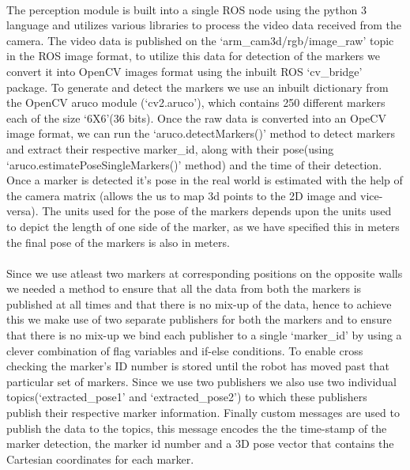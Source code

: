 \paragraph{} The perception module is built into a single ROS node using the python 3 language and utilizes various libraries to process the video data received from the camera. The video data is published on the `arm\_cam3d/rgb/image\_raw' topic in the ROS image format, to utilize this data for detection of the markers we convert it into OpenCV images format using the inbuilt ROS `cv\_bridge' package. To generate and detect the markers we use an inbuilt dictionary from the OpenCV aruco module (`cv2.aruco'), which contains 250 different markers each of the size `6X6'(36 bits). Once the raw data is converted into an OpeCV image format, we can run the `aruco.detectMarkers()' method to detect markers and extract their respective marker\_id, along with their pose(using `aruco.estimatePoseSingleMarkers()' method) and the time of their detection. Once a marker is detected it's pose in the real world is estimated with the help of the camera matrix (allows the us to map 3d points to the 2D image and vice-versa). The units used for the pose of the markers depends upon the units used to depict the length of one side of the marker, as we have specified this in meters the final pose of the markers is also in meters.

\paragraph{} Since we use atleast two markers at corresponding positions on the opposite walls we needed a method to ensure that all the data from both the markers is published at all times and that there is no mix-up of the data, hence to achieve this we make use of two separate publishers for both the markers and to ensure that there is no mix-up we bind each publisher to a single `marker\_id' by using a clever combination of flag variables and if-else conditions. To enable cross checking the marker's ID number is stored until the robot has moved past that particular set of markers. Since we use two publishers we also use two individual topics(`extracted\_pose1' and `extracted\_pose2') to which these publishers publish their respective marker information. Finally custom messages are used to publish the data to the topics, this message encodes the the time-stamp of the marker detection, the marker id number and a 3D pose vector that contains the Cartesian coordinates for each marker.

